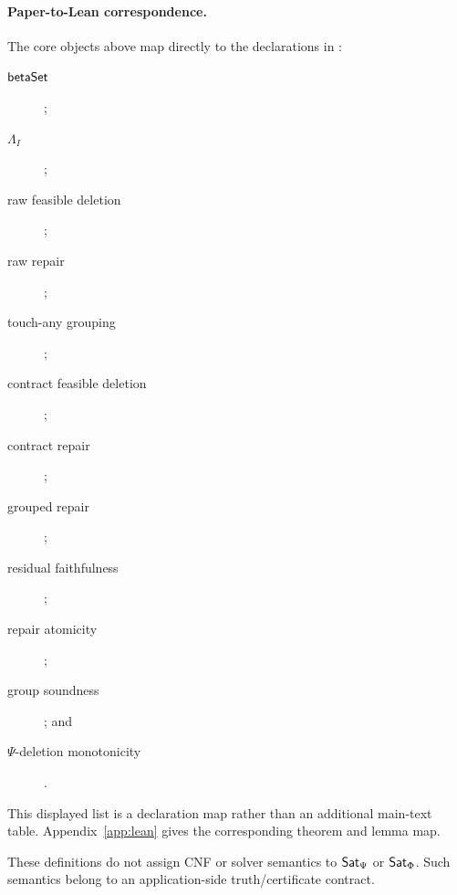 \paragraph{Paper-to-Lean correspondence.}
The core objects above map directly to the declarations in
:
\begin{description}
  \item[\(\mathsf{betaSet}\)] ;
  \item[\(\Lambda_I\)] ;
  \item[raw feasible deletion] ;
  \item[raw repair] ;
  \item[touch-any grouping] ;
  \item[contract feasible deletion] ;
  \item[contract repair] ;
  \item[grouped repair] ;
  \item[residual faithfulness] ;
  \item[repair atomicity] ;
  \item[group soundness] ; and
  \item[\(\Psi\)-deletion monotonicity] .
\end{description}
This displayed list is a declaration map rather than an additional
main-text table.  Appendix~\ref{app:lean} gives the corresponding theorem and
lemma map.

These definitions do not assign CNF or solver semantics to \(\mathsf{Sat}_{\Psi}\) or
\(\mathsf{Sat}_{\Phi}\).  Such semantics belong to an application-side truth/certificate
contract.
